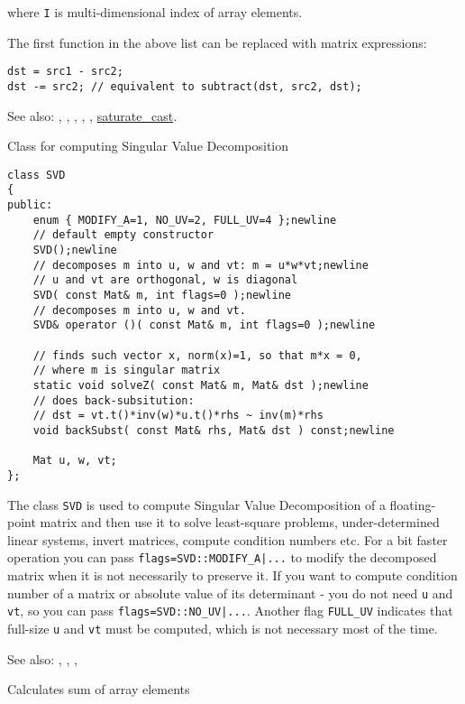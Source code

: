 where \texttt{I} is multi-dimensional index of array elements.

The first function in the above list can be replaced with matrix expressions:
\begin{lstlisting}
dst = src1 - src2;
dst -= src2; // equivalent to subtract(dst, src2, dst);
\end{lstlisting}

See also: , , , ,
, \hyperref[cppfunc.saturatecast]{saturate\_cast}.

Class for computing Singular Value Decomposition

\begin{lstlisting}
class SVD
{
public:
    enum { MODIFY_A=1, NO_UV=2, FULL_UV=4 };newline
    // default empty constructor
    SVD();newline
    // decomposes m into u, w and vt: m = u*w*vt;newline
    // u and vt are orthogonal, w is diagonal
    SVD( const Mat& m, int flags=0 );newline
    // decomposes m into u, w and vt.
    SVD& operator ()( const Mat& m, int flags=0 );newline

    // finds such vector x, norm(x)=1, so that m*x = 0,
    // where m is singular matrix
    static void solveZ( const Mat& m, Mat& dst );newline
    // does back-subsitution:
    // dst = vt.t()*inv(w)*u.t()*rhs ~ inv(m)*rhs
    void backSubst( const Mat& rhs, Mat& dst ) const;newline

    Mat u, w, vt;
};
\end{lstlisting}

The class \texttt{SVD} is used to compute Singular Value Decomposition of a floating-point matrix and then use it to solve least-square problems, under-determined linear systems, invert matrices, compute condition numbers etc.
For a bit faster operation you can pass \texttt{flags=SVD::MODIFY\_A|...} to modify the decomposed matrix when it is not necessarily to preserve it. If you want to compute condition number of a matrix or absolute value of its determinant - you do not need \texttt{u} and \texttt{vt}, so you can pass \texttt{flags=SVD::NO\_UV|...}. Another flag \texttt{FULL\_UV} indicates that full-size \texttt{u} and \texttt{vt} must be computed, which is not necessary most of the time.

See also: , , , 

Calculates sum of array elements

